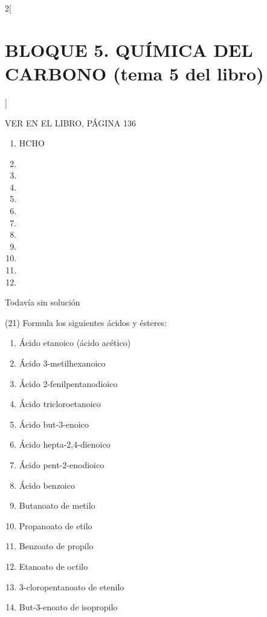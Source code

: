 \documentclass[10pt]{article}
\begin{document}
\begin{multicols}{2}[
  \section{BLOQUE 5. QUÍMICA DEL CARBONO (tema 5 del libro)}
  ]
\begin{exercise}[
    tags    = {},
    topics  = {química,química básica},
    source  = {FQ 1B MGH 2016, p85, e26},
  ]
  VER EN EL LIBRO, PÁGINA 136
  \begin{enumerate}
    \item HCHO
    \item {}
    \item {}
    \item {}
    \item {}
    \item {}
    \item {}
    \item {}
    \item {}
    \item {}
    \item {}
    \item {}
  \end{enumerate}
\end{exercise}

\begin{solution}[print=false]
  Todavía sin solución
\end{solution}




\begin{exercise}[
    tags    = {},
    topics  = {química,química básica},
    source  = {FQ 1B MGH 2016, p85, e26},
  ]

  (21) Formula los siguientes ácidos y ésteres:
  \begin{enumerate}
    \item Ácido etanoico (ácido acético)
    \item Ácido 3-metilhexanoico
    \item Ácido 2-fenilpentanodioico
    \item Ácido tricloroetanoico
    \item Ácido but-3-enoico
    \item Ácido hepta-2,4-dienoico
    \item Ácido pent-2-enodioico
    \item Ácido benzoico
    \item Butanoato de metilo
    \item Propanoato de etilo
    \item Benzoato de propilo
    \item Etanoato de octilo
    \item 3-cloropentanoato de etenilo
    \item But-3-enoato de isopropilo
  \end{enumerate}
\end{exercise}


\end{multicols}
\end{document}
